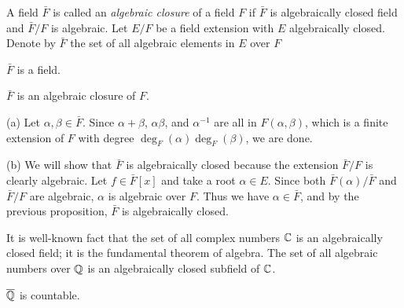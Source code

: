 \documentclass{../../large}
\begin{document}
\begin{prb}
A field $\bar F$ is called an \emph{algebraic closure} of a field $F$ if $\bar F$ is algebraically closed field and $\bar F/F$ is algebraic.
Let $E/F$ be a field extension with $E$ algebraically closed.
Denote by $\bar F$ the set of all algebraic elements in $E$ over $F$
\begin{parts}
\item $\bar F$ is a field.
\item $\bar F$ is an algebraic closure of $F$.
\end{parts}
\end{prb}
\begin{pf}
(a)
Let $\alpha,\beta\in\bar F$.
Since $\alpha+\beta$, $\alpha\beta$, and $\alpha^{-1}$ are all in $F(\alpha,\beta)$, which is a finite extension of $F$ with degree $\deg_F(\alpha)\deg_F(\beta)$, we are done.

(b)
We will show that $\bar F$ is algebraically closed because the extension $\bar F/F$ is clearly algebraic.
Let $f\in\bar F[x]$ and take a root $\alpha\in E$.
Since both $\bar F(\alpha)/\bar F$ and $\bar F/F$ are algebraic, $\alpha$ is algebraic over $F$.
Thus we have $\alpha\in\bar F$, and by the previous proposition, $\bar F$ is algebraically closed.
\end{pf}

\begin{prb}
It is well-known fact that the set of all complex numbers $\mathbb{C}$ is an algebraically closed field; it is the fundamental theorem of algebra.
The set of all algebraic numbers over $\mathbb{Q}$ is an algebraically closed subfield of $\mathbb{C}$.
\begin{parts}
\item $\overline{\mathbb{Q}}$ is countable.
\end{parts}
\end{prb}
\end{document}
